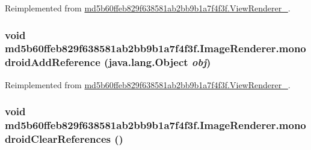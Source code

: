 Reimplemented from \hyperlink{classmd5b60ffeb829f638581ab2bb9b1a7f4f3f_1_1_view_renderer__2_a0898cf56fa9a49b653470eaf1608e77}{md5b60ffeb829f638581ab2bb9b1a7f4f3f.ViewRenderer\_}.\hypertarget{classmd5b60ffeb829f638581ab2bb9b1a7f4f3f_1_1_image_renderer_d03b188cd2a6839322ff08fe076796f9}{
\subsubsection[{monodroidAddReference}]{\setlength{\rightskip}{0pt plus 5cm}void md5b60ffeb829f638581ab2bb9b1a7f4f3f.ImageRenderer.monodroidAddReference (java.lang.Object {\em obj})}}
\label{classmd5b60ffeb829f638581ab2bb9b1a7f4f3f_1_1_image_renderer_d03b188cd2a6839322ff08fe076796f9}




Reimplemented from \hyperlink{classmd5b60ffeb829f638581ab2bb9b1a7f4f3f_1_1_view_renderer__2_64ca8244a89f60a47c173d9c0b15d610}{md5b60ffeb829f638581ab2bb9b1a7f4f3f.ViewRenderer\_}.\hypertarget{classmd5b60ffeb829f638581ab2bb9b1a7f4f3f_1_1_image_renderer_4787f75a8b34aa5636dbd2a7df23c9bf}{
\subsubsection[{monodroidClearReferences}]{\setlength{\rightskip}{0pt plus 5cm}void md5b60ffeb829f638581ab2bb9b1a7f4f3f.ImageRenderer.monodroidClearReferences ()}}
\label{classmd5b60ffeb829f638581ab2bb9b1a7f4f3f_1_1_image_renderer_4787f75a8b34aa5636dbd2a7df23c9bf}




